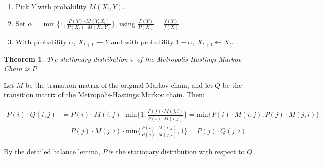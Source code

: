 \documentclass[twoside]{article}
\newcounter{lecnum}
\def\beginrefs{\begin{list}%
        {[\arabic{equation}]}{\usecounter{equation}
         \setlength{\leftmargin}{2.0truecm}\setlength{\labelsep}{0.4truecm}%
         \setlength{\labelwidth}{1.6truecm}}}
\def\endrefs{\end{list}}
\def\bibentry#1{\item[\hbox{[#1]}]}
\newtheorem{theorem}{Theorem}[lecnum]
\newenvironment{proof}{{\bf Proof:}}{\hfill\rule{2mm}{2mm}}
\begin{document}
\begin{enumerate}
   \item Pick $Y$ with probability $M(X_t, Y)$.
   \item Set $\alpha = \min\{ 1, \frac{P(Y) \cdot M(Y, X_t)}{P(X_t) \cdot M(X_t, Y)} \}$, using $\frac{P(Y)}{P(X)} = \frac{f(Y)}{f(X)}$
   \item With probability $\alpha$, $X_{t+1} \leftarrow Y$ and with probability $1 - \alpha$, $X_{t+1} \leftarrow X_t$.
\end{enumerate}

\begin{theorem}
  The stationary distribution $\pi$ of the Metropolis-Hastings Markov Chain is $P$
\end{theorem}

\begin{proof}
Let $M$ be the transition matrix of the original Markov chain, and let $Q$ be the transition matrix of the Metropolis-Hastings Markov chain. Then:

\begin{equation*}
\begin{split}
P(i) \cdot Q(i,j)  & = P(i) \cdot M(i,j) \cdot \mbox{min}\{1, \frac{P(j) \cdot M(j,i)}{P(i) \cdot M(i,j)}\} = \mbox{min}\{P(i) \cdot M(i,j), P(j) \cdot M(j,i) \} \\
& = P(j) \cdot M(j,i) \cdot \mbox{min}\{\frac{P(i) \cdot M(i,j)}{P(j) \cdot M(j,i)}, 1 \} = P(j) \cdot Q(j, i)
\end{split}
\end{equation*}

By the detailed balance lemma, $P$ is the stationary distribution with respect to $Q$
\end{proof}


\end{document}
